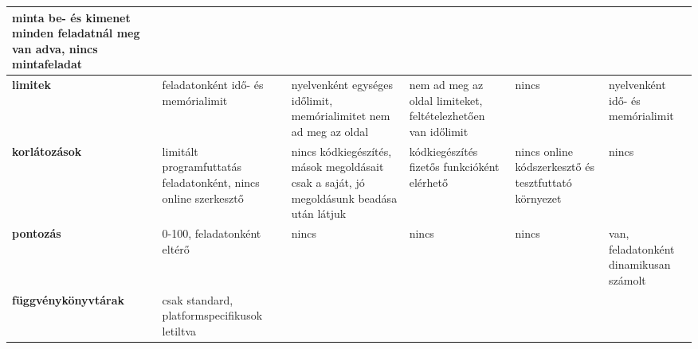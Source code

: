 {\begin{tabularx}{\textwidth}{@{}X|X|X|X|X|X@{}}
        minta be- és kimenet minden feladatnál meg van adva, nincs mintafeladat                                       \\ \hline
        \textbf{limitek}                                                                                            &
        feladatonként idő- és memórialimit                                                                          &
        nyelvenként egységes időlimit, memórialimitet nem ad meg az oldal                                           &
        nem ad meg az oldal limiteket, feltételezhetően van időlimit                                                &
        nincs                                                                                                       &
        nyelvenként idő- és memórialimit                                                                              \\ \hline
        \textbf{korlátozások}                                                                                       &
        limitált programfuttatás feladatonként, nincs online szerkesztő                                             &
        nincs kódkiegészítés, mások megoldásait csak a saját, jó megoldásunk beadása után látjuk                    &
        kódkiegészítés fizetős funkcióként elérhető                                                                 &
        nincs online kódszerkesztő és tesztfuttató környezet                                                        &
        nincs                                                                                                         \\ \hline
        \textbf{pontozás}                                                                                           &
        0-100, feladatonként eltérő                                                                                 &
        nincs                                                                                                       &
        nincs                                                                                                       &
        nincs                                                                                                       &
        van, feladatonként dinamikusan számolt                                                                        \\ \hline
        \textbf{függvény\-könyvtárak}                                                                               &
        csak standard, platformspecifikusok letiltva                                                                &

\end{tabularx}}
